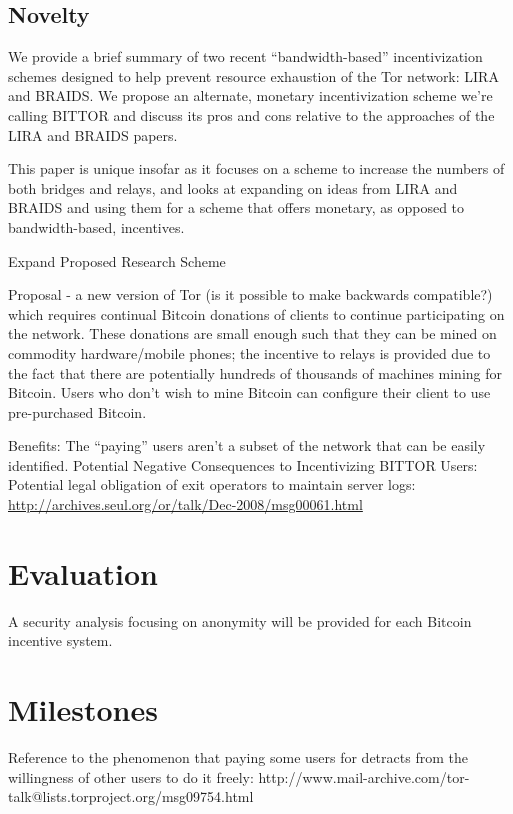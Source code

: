\documentclass[letterpaper]{article}
\begin{document}
\subsection{Novelty}\label{sec:novelty}

We provide a brief summary of two recent
“bandwidth-based” incentivization schemes designed to help prevent
resource exhaustion of the Tor network: LIRA and BRAIDS. We propose an
alternate, monetary incentivization scheme we’re calling BITTOR and
discuss its pros and cons relative to the approaches of the LIRA and
BRAIDS papers.

This paper is unique insofar as it focuses on a scheme to increase the
numbers of both bridges and relays, and looks at expanding on ideas
from LIRA and BRAIDS and using them for a scheme that offers monetary,
as opposed to bandwidth-based, incentives.

Expand Proposed Research Scheme

Proposal - a new version of Tor (is it possible to make backwards
compatible?) which requires continual Bitcoin donations of clients to
continue participating on the network. These donations are small
enough such that they can be mined on commodity hardware/mobile
phones; the incentive to relays is provided due to the fact that there
are potentially hundreds of thousands of machines mining for
Bitcoin. Users who don’t wish to mine Bitcoin can configure their
client to use pre-purchased Bitcoin.

Benefits:
The “paying” users aren’t a subset of the network that can be easily identified.
Potential Negative Consequences to Incentivizing BITTOR Users:
Potential legal obligation of exit operators to maintain server logs:
\url{http://archives.seul.org/or/talk/Dec-2008/msg00061.html}

\section{Evaluation}\label{sec:evaluation}
A security analysis focusing on anonymity will be provided for each
Bitcoin incentive system.
\section{Milestones}\label{sec:milestones}






Reference to the phenomenon that paying some users for detracts from
the willingness of other users to do it freely:
http://www.mail-archive.com/tor-talk@lists.torproject.org/msg09754.html






\end{document}
